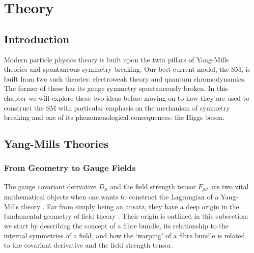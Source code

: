 \chapter{Theory}
\label{chap:theory}



\section{Introduction}
Modern particle physics theory is built upon the twin pillars of Yang-Mills theories and spontaneous symmetry breaking. 
Our best current model, the SM, is built from two such theories: electroweak theory and quantum chromodynamics. The former of these has its gauge symmetry spontaneously broken. 
In this chapter we will explore these two ideas before moving on to how they are used to construct the SM with particular emphasis on the mechanism of symmetry breaking and one of its phenomenological consequences: the Higgs boson. 

\section{Yang-Mills Theories}
\subsection{From Geometry to Gauge Fields}
The gauge covariant derivative $D_{\mu}$ and the field strength tensor $F_{\mu\nu}$ are two vital mathematical objects when one wants to construct the Lagrangian of a Yang-Mills theory \cite{PeskinSchroeder}.
Far from simply being an ansatz, they have a deep origin in the fundamental geometry of field theory \cite{penrose-roadtoreality-2005}. 
Their origin is outlined in this subsection: we start by describing the concept of a fibre bundle, its relationship to the internal symmetries of a field, and how the `warping' of a fibre bundle is related to the covariant derivative and the field strength tensor.

